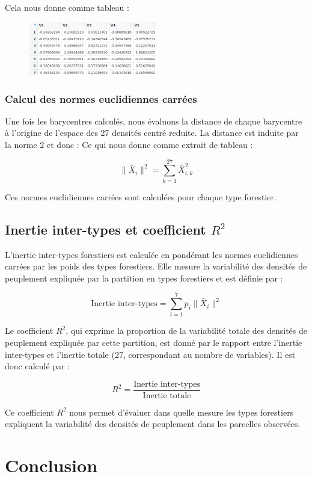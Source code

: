 \documentclass{article}
\begin{document}
Cela nous donne comme tableau :

\begin{figure}[h] 
    \centering
    \includegraphics[width=0.5\textwidth]{barycentre_forestier.png} 
\end{figure}


\subsubsection{Calcul des normes euclidiennes carrées}
Une fois les barycentres calculés, nous évaluons la distance de chaque barycentre à l'origine de l'espace des 27 densités centré reduite. La distance est induite par la norme 2 et donc :
Ce qui nous donne comme extrait de tableau : 

\[
\|\bar{X}_i\|^2 = \sum_{k=1}^{27} \bar{X}_{i,k}^2
\]

Ces normes euclidiennes carrées sont calculées pour chaque type forestier.

\subsection{Inertie inter-types et coefficient $R^2$}
L'inertie inter-types forestiers est calculée en pondérant les normes euclidiennes carrées par les poids des types forestiers. Elle mesure la variabilité des densités de peuplement expliquée par la partition en types forestiers et est définie par :

\[
\text{Inertie inter-types} = \sum_{i=1}^{7} p_i \|\bar{X}_i\|^2
\]

Le coefficient $R^2$, qui exprime la proportion de la variabilité totale des densités de peuplement expliquée par cette partition, est donné par le rapport entre l'inertie inter-types et l'inertie totale (27, correspondant au nombre de variables). Il est donc calculé par :

\[
R^2 = \frac{\text{Inertie inter-types}}{\text{Inertie totale}}
\]

Ce coefficient $R^2$ nous permet d'évaluer dans quelle mesure les types forestiers expliquent la variabilité des densités de peuplement dans les parcelles observées.



\newpage
\section{Conclusion}
\end{document}
